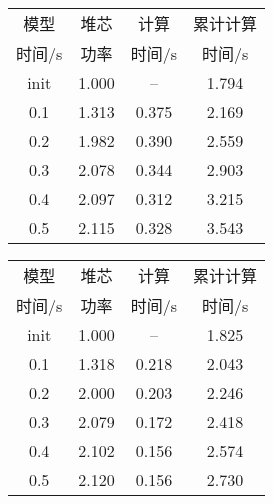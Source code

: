\begin{table}
{
\small
\begin{tabular}{cccc}
\toprule
模型 & 堆芯 & 计算 & 累计计算\\
时间/s & 功率 & 时间/s & 时间/s\\
\midrule
init & 1.000 & -- & 1.794\\
0.1 & 1.313 & 0.375 & 2.169\\
0.2 & 1.982 & 0.390 & 2.559\\
0.3 & 2.078 & 0.344 & 2.903\\
0.4 & 2.097 & 0.312 & 3.215\\
0.5 & 2.115 & 0.328 & 3.543\\
\bottomrule
\end{tabular}
}
{
\small
\begin{tabular}{cccc}
\toprule
模型 & 堆芯 & 计算 & 累计计算\\
时间/s & 功率 & 时间/s & 时间/s\\
\midrule
init & 1.000 & -- & 1.825\\
0.1 & 1.318 & 0.218 & 2.043\\
0.2 & 2.000 & 0.203 & 2.246\\
0.3 & 2.079 & 0.172 & 2.418\\
0.4 & 2.102 & 0.156 & 2.574\\
0.5 & 2.120 & 0.156 & 2.730\\
\bottomrule
\end{tabular}
}



\end{table}

